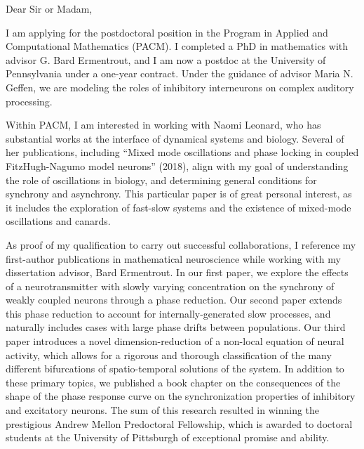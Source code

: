 \documentclass[11pt, a4paper]{letter} %
\begin{document}

\begin{letter}{}


\opening{Dear Sir or Madam,}

I am applying for the postdoctoral position in the Program in Applied and Computational Mathematics (PACM). I completed a PhD in mathematics with advisor G. Bard Ermentrout, and I am now a postdoc at the University of Pennsylvania under a one-year contract. Under the guidance of advisor Maria N. Geffen, we are modeling the roles of inhibitory interneurons on complex auditory processing.

Within PACM, I am interested in working with Naomi Leonard, who has substantial works at the interface of dynamical systems and biology. Several of her publications, including ``Mixed mode oscillations and phase locking in coupled FitzHugh-Nagumo model neurons'' (2018), align with my goal of understanding the role of oscillations in biology, and determining general conditions for synchrony and asynchrony. This particular paper is of great personal interest, as it includes the exploration of fast-slow systems and the existence of mixed-mode oscillations and canards.

As proof of my qualification to carry out successful collaborations, I reference my first-author publications in mathematical neuroscience while working with my dissertation advisor, Bard Ermentrout. In our first paper, we explore the effects of a neurotransmitter with slowly varying concentration on the synchrony of weakly coupled neurons through a phase reduction. Our second paper extends this phase reduction to account for internally-generated slow processes, and naturally includes cases with large phase drifts between populations. Our third paper introduces a novel dimension-reduction of a non-local equation of neural activity, which allows for a rigorous and thorough classification of the many different bifurcations of spatio-temporal solutions of the system. In addition to these primary topics, we published a book chapter on the consequences of the shape of the phase response curve on the synchronization properties of inhibitory and excitatory neurons. The sum of this research resulted in winning the prestigious Andrew Mellon Predoctoral Fellowship, which is awarded to doctoral students at the University of Pittsburgh of exceptional promise and ability.


\end{letter}
\end{document}
